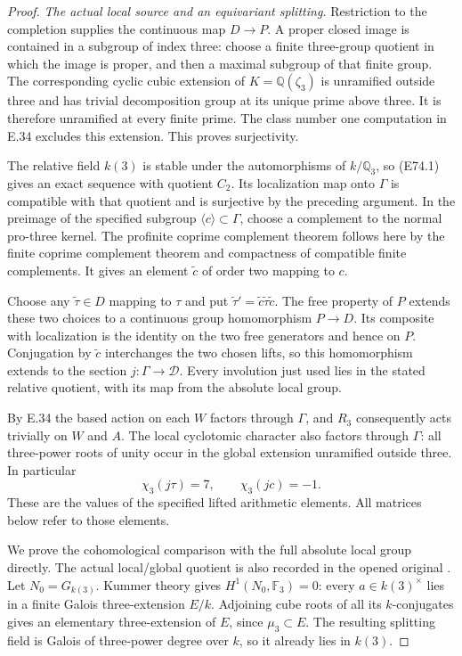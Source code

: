 \begin{proof}
\emph{The actual local source and an equivariant splitting.}
Restriction to the completion supplies the continuous map
$D\to P$. A proper closed image is contained in a subgroup
of index three: choose a finite three-group quotient in
which the image is proper, and then a maximal subgroup
of that finite group. The corresponding cyclic cubic
extension of $K=\mathbb Q(\zeta_3)$ is unramified outside
three and has trivial decomposition group at its unique
prime above three. It is therefore unramified at every
finite prime. The class number one computation in E.34
excludes this extension. This proves surjectivity.

The relative field $k(3)$ is stable under the automorphisms
of $k/\mathbb Q_3$, so (E74.1) gives an exact sequence
with quotient $C_2$. Its localization map onto $\Gamma$
is compatible with that quotient and is surjective by
the preceding argument. In the preimage of the specified
subgroup $\langle c\rangle\subset\Gamma$, choose a
complement to the normal pro-three kernel. The profinite
coprime complement theorem follows here by the finite
coprime complement theorem and compactness of compatible
finite complements. It gives an element $\widetilde c$
of order two mapping to $c$.

Choose any $\widetilde\tau\in D$ mapping to $\tau$ and
put $\widetilde\tau'=\widetilde c\widetilde\tau
\widetilde c$. The free property of $P$ extends these
two choices to a continuous group homomorphism $P\to D$.
Its composite with localization is the identity on the
two free generators and hence on $P$. Conjugation by
$\widetilde c$ interchanges the two chosen lifts, so this
homomorphism extends to the section $j:\Gamma\to\mathcal D$.
Every involution just used lies in the stated relative
quotient, with its map from the absolute local group.

By E.34 the based action on each $W$ factors through
$\Gamma$, and $R_3$ consequently acts trivially on $W$
and $A$. The local cyclotomic character also factors
through $\Gamma$: all three-power roots of unity occur
in the global extension unramified outside three.
In particular
\[
 \chi_3(j\tau)=7,\qquad \chi_3(jc)=-1.
 \tag{E74.9}
\]
These are the values of the specified lifted arithmetic
elements. All matrices below refer to those elements.

We prove the cohomological comparison with the full
absolute local group directly. The actual local/global
quotient is also recorded in the opened original
\cite[pp.~1--2; \S3]{E_WingbergFreeQuotients}.
Let $N_0=G_{k(3)}$. Kummer theory gives
$H^1(N_0,\mathbb F_3)=0$: every $a\in k(3)^\times$
lies in a finite Galois three-extension $E/k$.
Adjoining cube roots of all its $k$-conjugates gives
an elementary three-extension of $E$, since $\mu_3\subset E$.
The resulting splitting field is Galois of three-power
degree over $k$, so it already lies in $k(3)$.


\end{proof}
